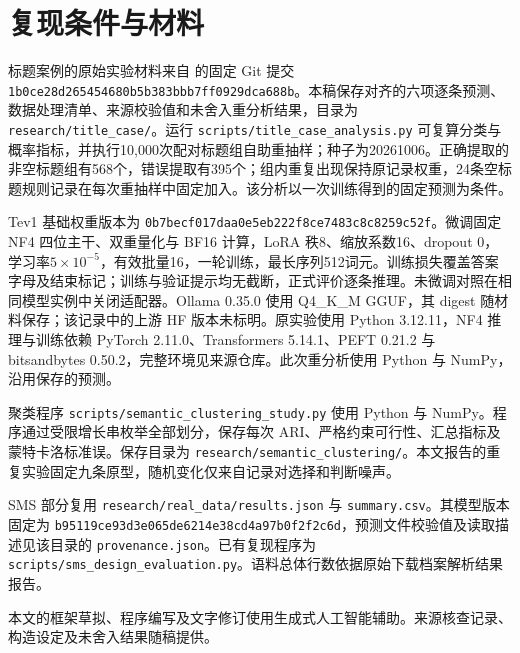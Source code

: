 \documentclass[UTF8,a4paper,zihao=-4,fontset=fandol]{ctexart}
\begin{document}
\section{复现条件与材料}\label{app:materials}

标题案例的原始实验材料来自 \citet{title-case} 的固定 Git 提交 \nolinkurl{1b0ce28d265454680b5b383bbb7ff0929dca688b}。本稿保存对齐的六项逐条预测、数据处理清单、来源校验值和未舍入重分析结果，目录为 \nolinkurl{research/title_case/}。运行 \nolinkurl{scripts/title_case_analysis.py} 可复算分类与概率指标，并执行10,000次配对标题组自助重抽样；种子为20261006。正确提取的非空标题组有568个，错误提取有395个；组内重复出现保持原记录权重，24条空标题规则记录在每次重抽样中固定加入。该分析以一次训练得到的固定预测为条件。

Tev1 基础权重版本为 \nolinkurl{0b7becf017daa0e5eb222f8ce7483c8c8259c52f}。微调固定 NF4 四位主干、双重量化与 BF16 计算，LoRA 秩8、缩放系数16、dropout 0，学习率$5\times10^{-5}$，有效批量16，一轮训练，最长序列512词元。训练损失覆盖答案字母及结束标记；训练与验证提示均无截断，正式评价逐条推理。未微调对照在相同模型实例中关闭适配器。Ollama 0.35.0 使用 Q4\_K\_M GGUF，其 digest 随材料保存；该记录中的上游 HF 版本未标明。原实验使用 Python 3.12.11，NF4 推理与训练依赖 PyTorch 2.11.0、Transformers 5.14.1、PEFT 0.21.2 与 bitsandbytes 0.50.2，完整环境见来源仓库。此次重分析使用 Python 与 NumPy，沿用保存的预测。

聚类程序 \nolinkurl{scripts/semantic_clustering_study.py} 使用 Python 与 NumPy。程序通过受限增长串枚举全部划分，保存每次 ARI、严格约束可行性、汇总指标及蒙特卡洛标准误。保存目录为 \nolinkurl{research/semantic_clustering/}。本文报告的重复实验固定九条原型，随机变化仅来自记录对选择和判断噪声。

SMS 部分复用 \nolinkurl{research/real_data/results.json} 与 \nolinkurl{summary.csv}。其模型版本固定为 \nolinkurl{b95119ce93d3e065de6214e38cd4a97b0f2f2c6d}，预测文件校验值及读取描述见该目录的 \nolinkurl{provenance.json}。已有复现程序为 \nolinkurl{scripts/sms_design_evaluation.py}。语料总体行数依据原始下载档案解析结果报告。

本文的框架草拟、程序编写及文字修订使用生成式人工智能辅助。来源核查记录、构造设定及未舍入结果随稿提供。
\end{document}
